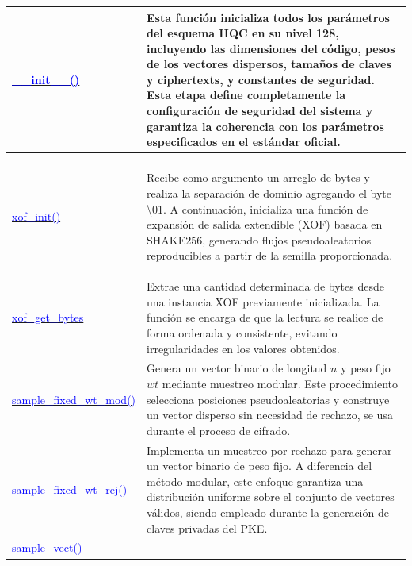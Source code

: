 \begin{longtable}{|>{\centering\arraybackslash}m{4.7cm}|>{\arraybackslash}m{11.9cm}|}
\href{https://github.com/camilo-home/hqc128/blob/30e4dd2663a1562349b38cff338aa3e4845d5bf5/hqc128.py#L7}{\textcolor{blue}{\_\_init\_\_()}} &
Esta función inicializa todos los parámetros del esquema HQC en su nivel 128, incluyendo las dimensiones del código, pesos de los vectores dispersos, tamaños de claves y ciphertexts, y constantes de seguridad. Esta etapa define completamente la configuración de seguridad del sistema y garantiza la coherencia con los parámetros especificados en el estándar oficial. \\
\hline
\multicolumn{2}{|c|}{\textbf{Funciones internas de expansión y muestreo}} \\
\hline
\href{https://github.com/camilo-home/hqc128/blob/30e4dd2663a1562349b38cff338aa3e4845d5bf5/hqc128.py#L37}{\textcolor{blue}{xof\_init()}} &
\hypertarget{xof_init}{Recibe como argumento un arreglo de bytes y realiza la separación de dominio agregando el byte \textbackslash01. A continuación, inicializa una función de expansión de salida extendible (XOF) basada en SHAKE256, generando flujos pseudoaleatorios reproducibles a partir de la semilla proporcionada.} \\
\hline
\href{https://github.com/camilo-home/hqc128/blob/30e4dd2663a1562349b38cff338aa3e4845d5bf5/hqc128.py#L41}{\textcolor{blue}{xof\_get\_bytes}} &
Extrae una cantidad determinada de bytes desde una instancia XOF previamente inicializada. La función se encarga de que la lectura se realice de forma ordenada y consistente, evitando irregularidades en los valores obtenidos. \\
\hline
\href{https://github.com/camilo-home/hqc128/blob/30e4dd2663a1562349b38cff338aa3e4845d5bf5/hqc128.py#L47}{\textcolor{blue}{sample\_fixed\_wt\_mod()}} &
Genera un vector binario de longitud $n$ y peso fijo $wt$ mediante muestreo modular. Este procedimiento selecciona posiciones pseudoaleatorias y construye un vector disperso sin necesidad de rechazo, se usa durante el proceso de cifrado. \\
\hline
\href{https://github.com/camilo-home/hqc128/blob/30e4dd2663a1562349b38cff338aa3e4845d5bf5/hqc128.py#L64}{\textcolor{blue}{sample\_fixed\_wt\_rej()}} &
Implementa un muestreo por rechazo para generar un vector binario de peso fijo. A diferencia del método modular, este enfoque garantiza una distribución uniforme sobre el conjunto de vectores válidos, siendo empleado durante la generación de claves privadas del PKE. \\
\hline
\href{https://github.com/camilo-home/hqc128/blob/30e4dd2663a1562349b38cff338aa3e4845d5bf5/hqc128.py#L83}{\textcolor{blue}{sample\_vect()}} &

\end{longtable}

